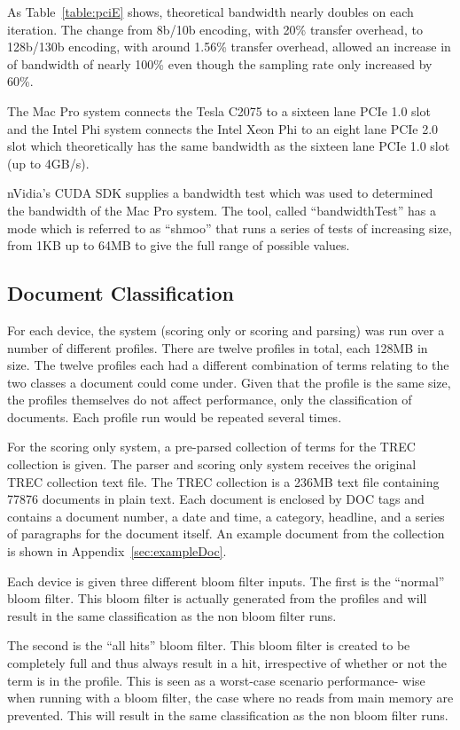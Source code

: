 As Table~\ref{table:pciE} shows, theoretical bandwidth nearly doubles on each
iteration. The change from 8b/10b encoding, with 20\% transfer overhead, to
128b/130b encoding, with around 1.56\% transfer overhead, allowed an increase in
of bandwidth of nearly 100\% even though the sampling rate only increased by
60\%.

The Mac Pro system connects the Tesla C2075 to a sixteen lane PCIe 1.0 slot and
the Intel Phi system connects the Intel Xeon Phi to an eight lane PCIe 2.0 slot
which theoretically has the same bandwidth as the sixteen lane PCIe 1.0 slot (up
to 4GB/s).

nVidia's CUDA SDK supplies a bandwidth test which was used to determined the
bandwidth of the Mac Pro system. The tool, called ``bandwidthTest'' has a mode
which is referred to as ``shmoo'' that runs a series of tests of increasing
size, from 1KB up to 64MB to give the full range of possible values.

\subsection{Document Classification}

For each device, the system (scoring only or scoring and parsing) was run over a
number of different profiles. There are twelve profiles in total, each 128MB in
size. The twelve profiles each had a different combination of terms relating to
the two classes a document could come under. Given that the profile is the same
size, the profiles themselves do not affect performance, only the classification
of documents. Each profile run would be repeated several times.

For the scoring only system, a pre-parsed collection of terms for the TREC
collection is given. The parser and scoring only system receives the original
TREC collection text file. The TREC collection is a 236MB text file containing
77876 documents in plain text. Each document is enclosed by DOC tags and
contains a document number, a date and time, a category, headline, and a series
of paragraphs for the document itself. An example document from the collection
is shown in Appendix~\ref{sec:exampleDoc}.

Each device is given three different bloom filter inputs. The first is the
``normal'' bloom filter. This bloom filter is actually generated from the
profiles and will result in the same classification as the non bloom filter
runs.

The second is the ``all hits'' bloom filter. This bloom filter is created to be
completely full and thus always result in a hit, irrespective of whether or not
the term is in the profile. This is seen as a worst-case scenario performance-
wise when running with a bloom filter, the case where no reads from main memory
are prevented. This will result in the same classification as the non bloom
filter runs.

